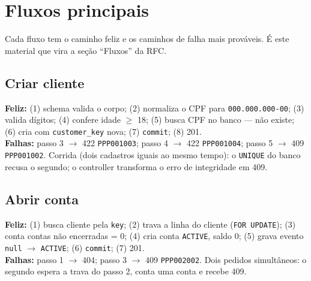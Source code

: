 \documentclass[11pt,a4paper]{article}
\newcommand{\tb}[1]{\texttt{#1}}           %
\begin{document}
\section{Fluxos principais}

Cada fluxo tem o caminho feliz e os caminhos de falha mais prováveis. É este material que vira a
seção ``Fluxos'' da RFC.

\subsection{Criar cliente}
\textbf{Feliz:} (1) schema valida o corpo; (2) normaliza o CPF para \tb{000.000.000-00}; (3) valida dígitos;
(4) confere idade $\ge$ 18; (5) busca CPF no banco --- não existe; (6) cria com \tb{customer_key}
nova; (7) \tb{commit}; (8) 201.\\
\textbf{Falhas:} passo 3 $\to$ 422 \tb{PPP001003}; passo 4 $\to$ 422 \tb{PPP001004}; passo 5 $\to$
409 \tb{PPP001002}. Corrida (dois cadastros iguais ao mesmo tempo): o \tb{UNIQUE} do banco recusa
o segundo; o controller transforma o erro de integridade em 409.

\subsection{Abrir conta}
\textbf{Feliz:} (1) busca cliente pela \tb{key}; (2) trava a linha do cliente (\tb{FOR UPDATE});
(3) conta contas não encerradas = 0; (4) cria conta \tb{ACTIVE}, saldo 0; (5) grava evento
\tb{null} $\to$ \tb{ACTIVE}; (6) \tb{commit}; (7) 201.\\
\textbf{Falhas:} passo 1 $\to$ 404; passo 3 $\to$ 409 \tb{PPP002002}. Dois pedidos simultâneos: o
segundo espera a trava do passo 2, conta uma conta e recebe 409.
\end{document}
